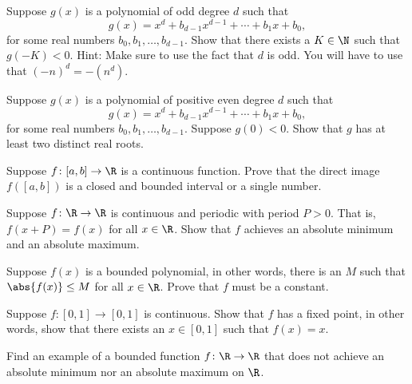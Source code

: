 \documentclass[12pt]{book}
\begin{document}
\begin{exercise}
Suppose $g(x)$ is a polynomial of odd degree $d$ such that
\begin{equation*}
g(x) = x^d + b_{d-1} x^{d-1} + \cdots + b_1 x + b_0 ,
\end{equation*}
for some real numbers $b_{0}, b_1, \ldots, b_{d-1}$.
Show that there exists
a $K \in \N$ such that $g(-K) < 0$.
Hint: Make sure to use the fact that
$d$ is odd.
You will have to use that ${(-n)}^d = -(n^d)$.
\end{exercise}

\begin{exercise}
Suppose $g(x)$ is a polynomial of positive even degree $d$ such that
\begin{equation*}
g(x) = x^d + b_{d-1} x^{d-1} + \cdots + b_1 x + b_0 ,
\end{equation*}
for some real numbers $b_{0}, b_1, \ldots, b_{d-1}$.
Suppose 
$g(0) < 0$.
Show that $g$ has at least two distinct real roots.
\end{exercise}

\begin{exercise} \label{exercise:imageofinterval}
Suppose $f \colon [a,b] \to \R$ is a continuous function.
Prove
that the direct image $f([a,b])$ is a closed and bounded interval or
a single number.
\end{exercise}

\begin{exercise}
Suppose $f \colon \R \to \R$ is continuous and periodic with period
$P > 0$.
That is, $f(x+P) = f(x)$ for all $x \in \R$.
Show that $f$
achieves an absolute minimum and an absolute maximum.
\end{exercise}

\begin{exercise}[Challenging]
Suppose $f(x)$ is a bounded polynomial,
in other words, there is an $M$ such that $\abs{f(x)} \leq M$
for all $x \in \R$.
Prove that $f$ must be a constant.
\end{exercise}

\begin{exercise}
Suppose $f \colon [0,1] \to [0,1]$ is continuous.
Show that $f$
has a fixed point, in other words, show that there exists an $x \in [0,1]$ such that
$f(x) = x$.
\end{exercise}

\begin{exercise}
Find an example of a bounded function $f \colon \R \to \R$ that does
not achieve an absolute minimum nor an absolute maximum on $\R$.
\end{exercise}
\end{document}
